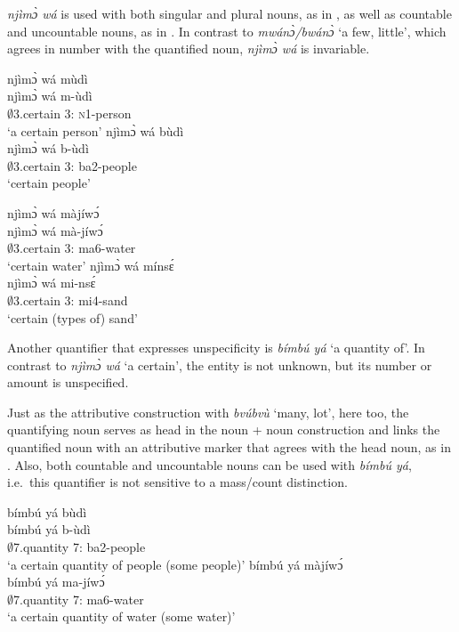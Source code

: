 {\itshape njìmɔ̀ wá} is used with both singular and plural nouns, as in , as well as countable and uncountable nouns, as in .  In contrast to {\itshape mwánɔ̀/bwánɔ̀} `a few, little', which agrees in number with the quantified noun, {\itshape njìmɔ̀ wá} is invariable. 

\ea\label{ndjimo}
\ea \label{ndjimo1}
  \glll   njìmɔ̀ wá mùdì  \\
  njìmɔ̀ wá m-ùdì  \\
 $\emptyset$3.certain 3:{\ATT} \textsc{n}1-person \\
    \trans `a certain person'
\ex\label{ndjimo2}
 \glll    njìmɔ̀ wá  bùdì \\
 njìmɔ̀ wá  b-ùdì \\
$\emptyset$3.certain 3:{\ATT} ba2-people  \\
    \trans `certain people'
\z
\z

\ea\label{ndjimob}
\ea \label{ndjimob1}
  \glll  njìmɔ̀ wá màjíwɔ́ \\
  njìmɔ̀ wá mà-jíwɔ́ \\
        $\emptyset$3.certain 3:{\ATT} ma6-water \\
    \trans `certain water'
\ex\label{ndjimob2}
 \glll    njìmɔ̀ wá mínsɛ́ \\
 njìmɔ̀ wá  mi-nsɛ́ \\
$\emptyset$3.certain 3:{\ATT} mi4-sand  \\
    \trans `certain (types of) sand'
\z
\z


Another quantifier that expresses unspecificity is {\itshape bímbú yá} `a quantity of'. In contrast to {\itshape njìmɔ̀ wá} `a certain', the entity is not unknown, but its number or amount is unspecified.

 Just as the attributive construction with {\itshape bvúbvù} `many, lot', here too,  the quantifying noun serves as head in the noun + noun construction and links the quantified noun with an attributive marker that agrees with the head noun, as in . Also, both countable and uncountable nouns can be used with {\itshape bímbú yá}, i.e.~this quantifier is not sensitive to a mass/count distinction.

\ea\label{bimbu}
\ea \label{bimbu1}
  \glll bímbú yá bùdì \\
  bímbú yá b-ùdì \\
$\emptyset$7.quantity 7:{\ATT} ba2-people \\
\trans `a certain quantity of people (some people)'
\ex\label{bimbu2}
 \glll    bímbú yá màjíwɔ́  \\
 bímbú yá ma-jíwɔ́  \\
$\emptyset$7.quantity 7:{\ATT} ma6-water  \\
    \trans `a certain quantity of water (some water)'
\z
\z

